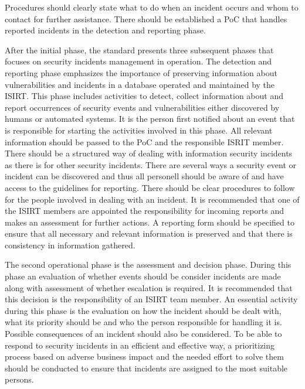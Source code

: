 Procedures should clearly state what to do when an incident occurs and whom to contact for further assistance. There should be established a \acs{PoC} that handles reported incidents in the detection and reporting phase.

After the initial phase, the standard presents three subsequent phases that focuses on  security incidents management in operation. The detection and reporting phase emphasizes the importance of preserving information about vulnerabilities and incidents in a database operated and maintained by the ISIRT. This phase includes activities to detect, collect information about and report occurrences of security events and vulnerabilities either discovered by humans or automated systems. It is the person first notified about an event that is responsible for starting the activities involved in this phase. All relevant information should be passed to the PoC and the responsible ISRIT member. There should be a structured way of dealing with information security incidents as there is for other security incidents. There are several ways a security event or incident can be discovered and thus all personell should be aware of and have access to the guidelines for reporting. There should be clear procedures to follow for the people involved in dealing with an incident. It is recommended that one of the ISIRT members are appointed the responsibility for incoming reports and makes an assessment for further actions.  A reporting form should be specified to ensure that all necessary and relevant information is preserved and that there is consistency in information gathered. 

The second operational phase is the assessment and decision phase. During this phase an evaluation of whether events should be consider incidents are made along with assessment of whether escalation is required. It is recommended that this decision is the responsibility of an ISIRT team member. An essential activity during this phase is the evaluation on how the incident should be dealt with, what its priority should be and who the person responsible for handling it is. Possible consequences of an incident should also be considered. To be able to respond to security incidents in an efficient and effective way, a prioritizing process based on adverse business impact and the needed effort to solve them should be conducted to ensure that incidents are assigned to the most suitable persons. 

